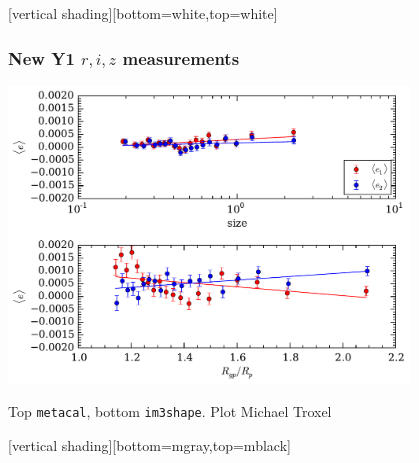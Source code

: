 \documentclass{beamer}
\begin{document}
{
    [vertical shading][bottom=white,top=white]
    \frame
    {
        \frametitle{New Y1 $r,i,z$ measurements}

                \begin{center}
                    \includegraphics[width=0.8\textwidth]{lin_split_radius.pdf}
                \end{center}

        \vspace{5mm}
        Top \texttt{metacal}, bottom \texttt{im3shape}. Plot Michael Troxel


    }
    [vertical shading][bottom=mgray,top=mblack]
}
\end{document}
